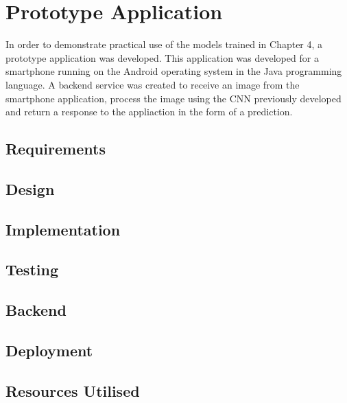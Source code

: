 \chapter{Prototype Application}
\label{prototype}
In order to demonstrate practical use of the models trained in Chapter 4, a prototype application was developed.
This application was developed for a smartphone running on the Android operating system in the Java programming language.
A backend service was created to receive an image from the smartphone application, process the image using the CNN previously developed and return a response to the appliaction in the form of a prediction. 

\section{Requirements}


\section{Design}


\section{Implementation}


\section{Testing}


\section{Backend}


\section{Deployment}


\section{Resources Utilised}

